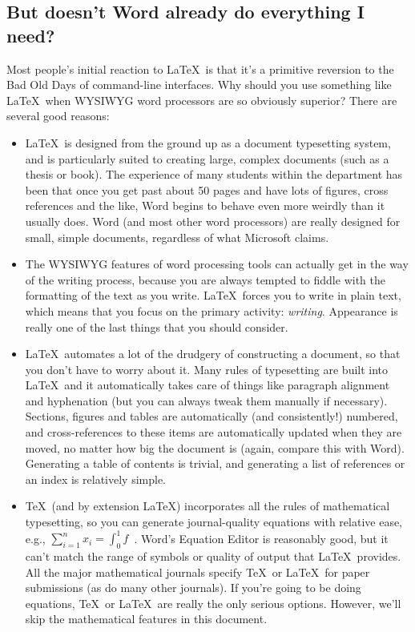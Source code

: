 \documentclass[12pt,a4paper,pdftex]{article}
\begin{document}
\subsection{But doesn't Word already do everything I need?}
\label{sec:Word}

Most people's initial reaction to \LaTeX\ is that it's a primitive reversion to the Bad Old Days of command-line interfaces. Why should you use something like \LaTeX\ when WYSIWYG word processors are so obviously superior? There are several good reasons:

\begin{itemize}

	\item \LaTeX\ is designed from the ground up as a document typesetting system, and is particularly suited to creating large, complex documents (such as a thesis or book). The experience of many students within the department has been that once you get past about 50 pages and have lots of figures, cross references and the like, Word begins to behave even more weirdly than it usually does. Word (and most other word processors) are really designed for small, simple documents, regardless of what Microsoft claims.
	
	\item The WYSIWYG features of word processing tools can actually get in the way of the writing process, because you are always tempted to fiddle with the formatting of the text as you write. \LaTeX\ forces you to write in plain text, which means that you focus on the primary activity: \emph{writing}. Appearance is really one of the last things that you should consider.
	
	\item \LaTeX\ automates a lot of the drudgery of constructing a document, so that you don't have to worry about it. Many rules of typesetting are built into \LaTeX\, and it automatically takes care of things like paragraph alignment and hyphenation (but you can always tweak them manually if necessary). Sections, figures and tables are automatically (and consistently!) numbered, and cross-references to these items are automatically updated when they are moved, no matter how big the document is (again, compare this with Word). Generating a table of contents is trivial, and generating a list of references or an index is relatively simple.
	
	\item \TeX\ (and by extension \LaTeX) incorporates all the rules of mathematical typesetting, so you can generate journal-quality equations with relative ease, e.g., \(\sum_{i=1}^{n} x_{i} = \int_{0}^{1} f\)~\cite{UsersGuide}. Word's Equation Editor is reasonably good, but it can't match the range of symbols or quality of output that \LaTeX\ provides. All the major mathematical journals specify \TeX\ or \LaTeX\ for paper submissions (as do many other journals). If you're going to be doing equations, \TeX\ or \LaTeX\ are really the only serious options. However, we'll skip the mathematical features in this document.
	

\end{itemize}
\end{document}
